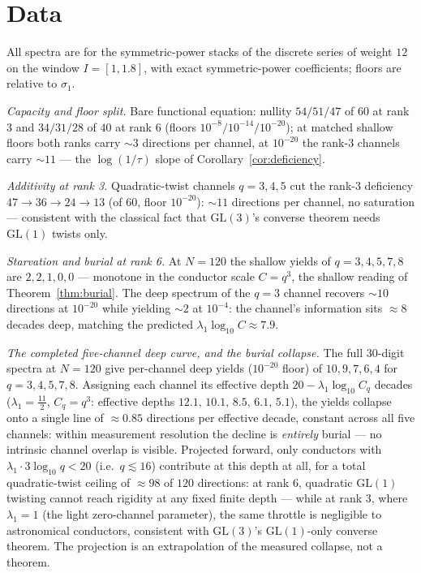 \documentclass[11pt]{article}
\theoremstyle{definition}
\theoremstyle{remark}
\begin{document}
\section{Data}\label{sec:data}

All spectra are for the symmetric-power stacks of the discrete series of
weight $12$ on the window $I=[1,1.8]$, with exact symmetric-power
coefficients; floors are relative to $\sigma_1$.

\medskip
\noindent\emph{Capacity and floor split.}  Bare functional equation:
nullity $54/51/47$ of $60$ at rank $3$ and $34/31/28$ of $40$ at rank $6$
(floors $10^{-8}/10^{-14}/10^{-20}$); at matched shallow floors both ranks
carry $\sim3$ directions per channel, at $10^{-20}$ the rank-$3$ channels
carry $\sim11$ --- the $\log(1/\tau)$ slope of
Corollary~\ref{cor:deficiency}.

\medskip
\noindent\emph{Additivity at rank 3.}  Quadratic-twist channels
$q=3,4,5$ cut the rank-$3$ deficiency $47\to36\to24\to13$ (of $60$, floor
$10^{-20}$): $\sim11$ directions per channel, no saturation --- consistent
with the classical fact that $\mathrm{GL}(3)$'s converse theorem needs
$\mathrm{GL}(1)$ twists only.

\medskip
\noindent\emph{Starvation and burial at rank 6.}  At $N=120$ the shallow
yields of $q=3,4,5,7,8$ are $2,2,1,0,0$ --- monotone in the conductor scale
$C=q^3$, the shallow reading of Theorem~\ref{thm:burial}.  The deep
spectrum of the $q=3$ channel recovers $\sim10$ directions at $10^{-20}$
while yielding $\sim2$ at $10^{-4}$: the channel's information sits
$\approx8$ decades deep, matching the predicted
$\lambda_1\log_{10}C\approx7.9$.

\medskip
\noindent\emph{The completed five-channel deep curve, and the burial
collapse.}  The full $30$-digit spectra at $N=120$ give per-channel deep
yields ($10^{-20}$ floor) of $10,9,7,6,4$ for $q=3,4,5,7,8$.  Assigning
each channel its effective depth $20-\lambda_1\log_{10}C_q$ decades
($\lambda_1=\tfrac{11}{2}$, $C_q=q^3$: effective depths
$12.1,\,10.1,\,8.5,\,6.1,\,5.1$), the yields collapse onto a single line
of $\approx0.85$ directions per effective decade, constant across all five
channels: within measurement resolution the decline is \emph{entirely}
burial --- no intrinsic channel overlap is visible.  Projected forward,
only conductors with $\lambda_1\cdot3\log_{10}q<20$ (i.e.\ $q\lesssim16$)
contribute at this depth at all, for a total quadratic-twist ceiling of
$\approx98$ of $120$ directions: at rank $6$, quadratic
$\mathrm{GL}(1)$ twisting cannot reach rigidity at any fixed finite depth
--- while at rank $3$, where $\lambda_1=1$ (the light zero-channel
parameter), the same throttle is negligible to astronomical conductors,
consistent with $\mathrm{GL}(3)$'s $\mathrm{GL}(1)$-only converse theorem.
The projection is an extrapolation of the measured collapse, not a
theorem.
\end{document}
